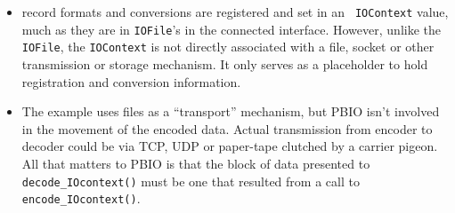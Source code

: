\documentclass{article}
\begin{document}
\begin{itemize}
\item record formats and conversions are registered and set in an {\tt
IOContext} value, much as they are in {\tt IOFile}'s in the connected
interface.  However, unlike the {\tt IOFile}, the {\tt IOContext} is not
directly associated with a file, socket or other transmission or storage
mechanism.  It only serves as a placeholder to hold registration and
conversion information.
\item The example uses files as a ``transport'' mechanism, but PBIO isn't
involved in the movement of the encoded data.  Actual transmission from
encoder to decoder could be via TCP, UDP or paper-tape clutched by a carrier
pigeon.  All that matters to PBIO is that the block of data presented to
{\tt decode\_IOcontext()} must be one that resulted from a call to
{\tt encode\_IOcontext()}.
\end{itemize}
\end{document}

